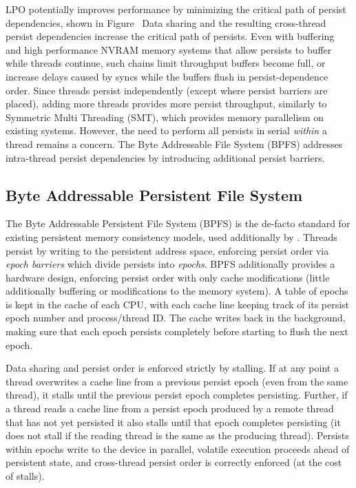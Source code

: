 
LPO potentially improves performance by minimizing the critical path of persist dependencies, shown in Figure~
Data sharing and the resulting cross-thread persist dependencies increase the critical path of persists.
Even with buffering and high performance NVRAM memory systems that allow persists to buffer while threads continue, such chains limit throughput buffers become full, or increase delays caused by syncs while the buffers flush in persist-dependence order.
Since threads persist independently (except where persist barriers are placed), adding more threads provides more persist throughput, similarly to Symmetric Multi Threading (SMT), which provides memory parallelism on existing systems.
However, the need to perform all persists in serial \emph{within} a thread remains a concern.
The Byte Addressable File System (BPFS) addresses intra-thread persist dependencies by introducing additional persist barriers.

\subsection{Byte Addressable Persistent File System}
\label{sec:PMC:PersistenceModels:BPFS}

The Byte Addressable Persistent File System (BPFS)  is the de-facto standard for existing persistent memory consistency models, used additionally by .
Threads persist by writing to the persistent address space, enforcing persist order via \emph{epoch barriers} which divide persists into \emph{epochs}.
BPFS additionally provides a hardware design, enforcing persist order with only cache modifications (little additionally buffering or modifications to the memory system).
A table of epochs is kept in the cache of each CPU, with each cache line keeping track of its persist epoch number and process/thread ID.
The cache writes back in the background, making sure that each epoch persists completely before starting to flush the next epoch.

Data sharing and persist order is enforced strictly by stalling.
If at any point a thread overwrites a cache line from a previous persist epoch (even from the same thread), it stalls until the previous persist epoch completes persisting.
Further, if a thread reads a cache line from a persist epoch produced by a remote thread that has not yet persisted it also stalls until that epoch completes persisting (it does not stall if the reading thread is the same as the producing thread).
Persists within epochs write to the device in parallel, volatile execution proceeds ahead of persistent state, and cross-thread persist order is correctly enforced (at the cost of stalls).

